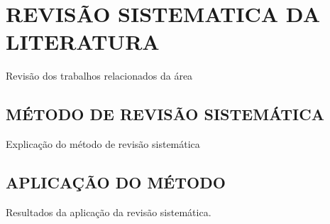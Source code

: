 
\chapter{REVISÃO SISTEMATICA DA LITERATURA}
\label{chap:revisaoSistematica}
Revisão dos trabalhos relacionados da área

\section{MÉTODO DE REVISÃO SISTEMÁTICA}
\label{sec:metodoRevisao}
Explicação do método de revisão sistemática

\section{APLICAÇÃO DO MÉTODO}
\label{sec:aplicacaoRevisao}
Resultados da aplicação da revisão sistemática.



